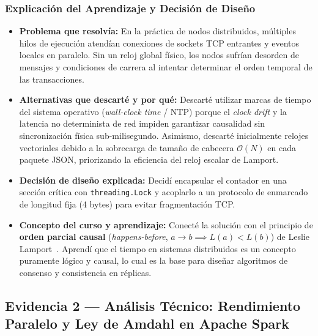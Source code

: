 \documentclass[11pt,a4paper]{article}
\begin{document}
\subsubsection{Explicación del Aprendizaje y Decisión de Diseño}
\begin{itemize}
    \item \textbf{Problema que resolvía:} En la práctica de nodos distribuidos, múltiples hilos de ejecución atendían conexiones de sockets TCP entrantes y eventos locales en paralelo. Sin un reloj global físico, los nodos sufrían desorden de mensajes y condiciones de carrera al intentar determinar el orden temporal de las transacciones.
    \item \textbf{Alternativas que descarté y por qué:} Descarté utilizar marcas de tiempo del sistema operativo (\textit{wall-clock time} / NTP) porque el \textit{clock drift} y la latencia no determinista de red impiden garantizar causalidad sin sincronización física sub-milisegundo. Asimismo, descarté inicialmente relojes vectoriales debido a la sobrecarga de tamaño de cabecera $\mathcal{O}(N)$ en cada paquete JSON, priorizando la eficiencia del reloj escalar de Lamport.
    \item \textbf{Decisión de diseño explicada:} Decidí encapsular el contador en una sección crítica con \texttt{threading.Lock} y acoplarlo a un protocolo de enmarcado de longitud fija (4 bytes) para evitar fragmentación TCP.
    \item \textbf{Concepto del curso y aprendizaje:} Conecté la solución con el principio de \textbf{orden parcial causal} (\textit{happens-before}, $a \to b \implies L(a) < L(b)$) de Leslie Lamport~\cite{lamport1978time}. Aprendí que el tiempo en sistemas distribuidos es un concepto puramente lógico y causal, lo cual es la base para diseñar algoritmos de consenso y consistencia en réplicas.
\end{itemize}

\subsection{Evidencia 2 — Análisis Técnico: Rendimiento Paralelo y Ley de Amdahl en Apache Spark}
\end{document}
